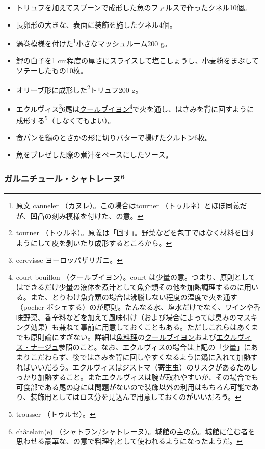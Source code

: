 \begin{recette}
\begin{itemize}
\item
  トリュフを加えてスプーンで成形した魚のファルスで作ったクネル10個。
\item
  長卵形の大きな、表面に装飾を施したクネル4個。
\item
  渦巻模様を付けた\footnote{原文 canneler （カヌレ）。この場合はtourner
    （トゥルネ）とほぼ同義だが、凹凸の刻み模様を付けた、の意。}小さなマッシュルーム200
  g。
\item
  鯉の白子を1
  cm程度の厚さにスライスして塩こしょうし、小麦粉をまぶしてソテーしたもの10枚。
\item
  オリーブ形に成形した\footnote{tourner
    （トゥルネ）。原義は「回す」。野菜などを包丁ではなく材料を回すようにして皮を剥いたり成形するところから。}トリュフ200
  g。
\item
  エクルヴィス\footnote{ecrevisse ヨーロッパザリガニ。}6尾は\protect\hyperlink{courtbouillon-a}{クールブイヨン}\footnote{court-bouillon
    （クールブイヨン）。court
    は少量の意。つまり、原則としてはできるだけ少量の液体を煮汁として魚介類その他を加熱調理するのに用いる。また、とりわけ魚介類の場合は沸騰しない程度の温度で火を通す（pocher
    ポシェする）のが原則。たんなる水、塩水だけでなく、ワインや香味野菜、香辛料などを加えて風味付け（および場合によっては臭みのマスキング効果）も兼ねて事前に用意しておくこともある。ただしこれらはあくまでも原則論にすぎない。詳細は\protect\hyperlink{poissons}{魚料理}の\protect\hyperlink{serie-de-courts-bouillons-de-poisson}{クールブイヨン}および\protect\hyperlink{ecrevisse-a-la-nage}{エクルヴィス・ナージュ}参照のこと。なお、エクルヴィスの場合は上記の「少量」にあまりこだわらず、後ではさみを背に回しやすくなるように鍋に入れて加熱すればいいだろう。エクルヴィスはジストマ（寄生虫）のリスクがあるためしっかり加熱すること。またエクルヴィスは腕が取れやすいが、その場合でも可食部である尾の身には問題がないので装飾以外の利用はもちろん可能であり、装飾用としてはロス分を見込んで用意しておくのがいいだろう。}で火を通し、はさみを背に回すように成形する\footnote{trousser
    （トゥルセ）。}（しなくてもよい）。
\item
  食パンを鶏のとさかの形に切りバターで揚げたクルトン6枚。
\item
  魚をブレゼした際の煮汁をベースにしたソース。
\end{itemize}

\hypertarget{garniture-chatelaine}{%
\subsubsection[ガルニチュール・シャトレーヌ]{\texorpdfstring{ガルニチュール・シャトレーヌ\footnote{châtelain(e)
  （シャトラン/シャトレーヌ）。城館の主の意。城館に住む者を思わせる豪華な、の意で料理名として使われるようになったようだ。}}{ガルニチュール・シャトレーヌ}}\label{garniture-chatelaine}}


\end{recette}
